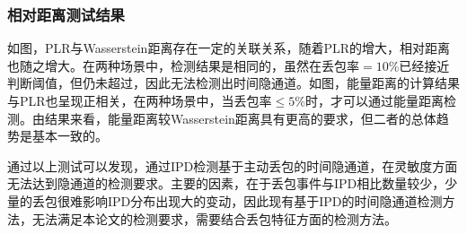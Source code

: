 \subsubsection{相对距离测试结果}
\label{chap:analyze:result:ipd:distance}


如图，PLR与Wasserstein距离存在一定的关联关系，随着PLR的增大，相对距离也随之增大。在两种场景中，检测结果是相同的，虽然在丢包率$=10\%$已经接近判断阈值，但仍未超过，因此无法检测出时间隐通道。如图，能量距离的计算结果与PLR也呈现正相关，在两种场景中，当丢包率$\le 5\%$时，才可以通过能量距离检测。由结果来看，能量距离较Wasserstein距离具有更高的要求，但二者的总体趋势是基本一致的。

通过以上测试可以发现，通过IPD检测基于主动丢包的时间隐通道，在灵敏度方面无法达到隐通道的检测要求。主要的因素，在于丢包事件与IPD相比数量较少，少量的丢包很难影响IPD分布出现大的变动，因此现有基于IPD的时间隐通道检测方法，无法满足本论文的检测要求，需要结合丢包特征方面的检测方法。

